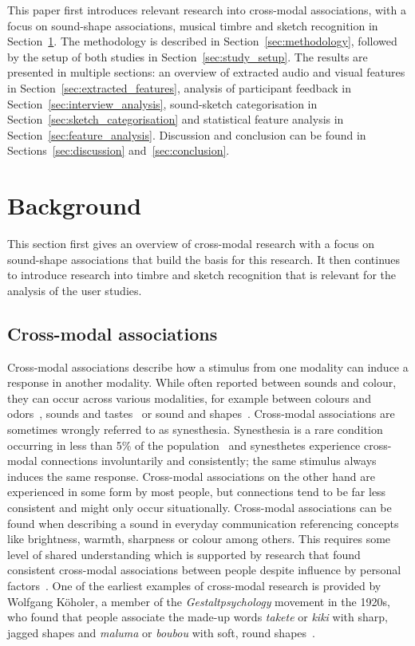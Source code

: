 \documentclass[]{interact}
\theoremstyle{plain}%
\theoremstyle{definition}
\theoremstyle{remark}
\begin{document}
This paper first introduces relevant research into cross-modal associations, with a focus on sound-shape associations, musical timbre and sketch recognition in Section~\ref{sec:background}. The methodology is described in Section~\ref{sec:methodology}, followed by the setup of both studies in Section~\ref{sec:study_setup}. The results are presented in multiple sections: an overview of extracted audio and visual features in Section~\ref{sec:extracted_features}, analysis of participant feedback in Section~\ref{sec:interview_analysis}, sound-sketch categorisation in Section~\ref{sec:sketch_categorisation} and statistical feature analysis in Section~\ref{sec:feature_analysis}. Discussion and conclusion can be found in Sections~\ref{sec:discussion} and~\ref{sec:conclusion}. 


\section{Background}\label{sec:background}
This section first gives an overview of cross-modal research with a focus on sound-shape associations that build the basis for this research. It then continues to introduce research into timbre and sketch recognition that is relevant for the analysis of the user studies.     

\subsection{Cross-modal associations}\label{subsec:sound-shape}
Cross-modal associations describe how a stimulus from one modality can induce a response in another modality. While often reported between sounds and colour, they can occur across various modalities, for example between colours and odors~\cite{}, sounds and tastes~\cite{} or sound and shapes~\cite{}. Cross-modal associations are sometimes wrongly referred to as synesthesia. Synesthesia is a rare condition occurring in less than 5{\%} of the population~\cite{} and synesthetes experience cross-modal connections involuntarily and consistently; the same stimulus always induces the same response. Cross-modal associations on the other hand are experienced in some form by most people, but connections tend to be far less consistent and might only occur situationally. Cross-modal associations can be found when describing a sound in everyday communication referencing concepts like brightness, warmth, sharpness or colour among others. This requires some level of shared understanding which is supported by research that found consistent cross-modal associations between people despite influence by personal factors~\cite{}. One of the earliest examples of cross-modal research is provided by Wolfgang K{\"o}holer, a member of the \textit{Gestaltpsychology} movement in the 1920s, who found that people associate the made-up words \textit{takete} or \textit{kiki} with sharp, jagged shapes and \textit{maluma} or \textit{boubou} with soft, round shapes~\cite{kohler1929gestalt}. 
\end{document}
